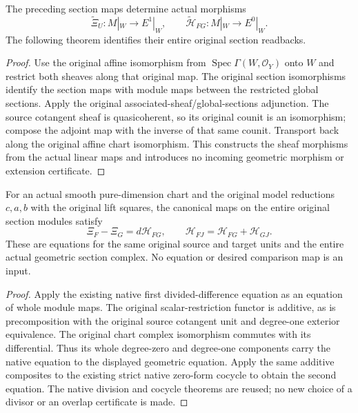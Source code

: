 \begin{definition}
\label{def:actual-witt-geometric-xi-homotopy-sheaf}
\leanok
The preceding section maps determine actual morphisms
\[
 \widetilde\Xi_U:M|_W\longrightarrow E^1|_W,
 \qquad \widetilde{\mathcal H}_{FG}:M|_W\longrightarrow E^0|_W.
\]
The following theorem identifies their entire original section readbacks.
\end{definition}
\begin{proof}
Use the original affine isomorphism from $\operatorname{Spec}\Gamma(W,\mathcal O_Y)$ onto $W$ and restrict both sheaves along that original map. The original section isomorphisms identify the section maps with module maps between the restricted global sections. Apply the original associated-sheaf/global-sections adjunction. The source cotangent sheaf is quasicoherent, so its original counit is an isomorphism; compose the adjoint map with the inverse of that same counit. Transport back along the original affine chart isomorphism. This constructs the sheaf morphisms from the actual linear maps and introduces no incoming geometric morphism or extension certificate.
\end{proof}

\begin{theorem}
\label{thm:whole-geometric-xi-homotopy-equations}
\leanok
For an actual smooth pure-dimension chart and the original model reductions $c,a,b$ with the original lift squares, the canonical maps on the entire original section modules satisfy
\[
 \Xi_F-\Xi_G=d\mathcal H_{FG},\qquad
 \mathcal H_{FJ}=\mathcal H_{FG}+\mathcal H_{GJ}.
\]
These are equations for the same original source and target units and the entire actual geometric section complex. No equation or desired comparison map is an input.
\end{theorem}
\begin{proof}
Apply the existing native first divided-difference equation as an equation of whole module maps. The original scalar-restriction functor is additive, as is precomposition with the original source cotangent unit and degree-one exterior equivalence. The original chart complex isomorphism commutes with its differential. Thus its whole degree-zero and degree-one components carry the native equation to the displayed geometric equation. Apply the same additive composites to the existing strict native zero-form cocycle to obtain the second equation. The native division and cocycle theorems are reused; no new choice of a divisor or an overlap certificate is made.
\end{proof}

